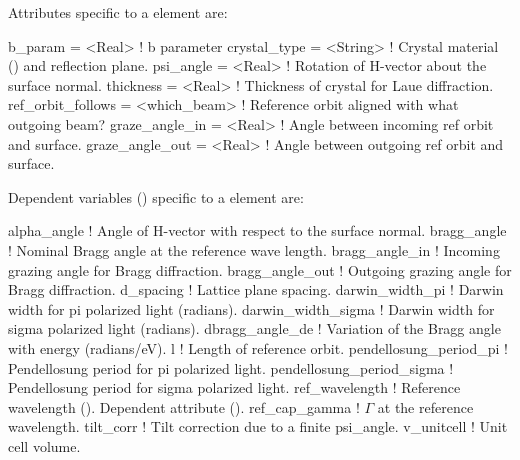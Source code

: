 Attributes specific to a  element are:
\begin{example}
  b_param            = <Real>       ! b parameter
  crystal_type       = <String>     ! Crystal material () and reflection plane.
  psi_angle          = <Real>       ! Rotation of H-vector about the surface normal.
  thickness          = <Real>       ! Thickness of crystal for Laue diffraction.
  ref_orbit_follows  = <which_beam> ! Reference orbit aligned with what outgoing beam?
  graze_angle_in     = <Real>       ! Angle between incoming ref orbit and surface.
  graze_angle_out    = <Real>       ! Angle between outgoing ref orbit and surface.
\end{example}


Dependent variables () specific to a  element are:
\begin{example}
  alpha_angle                ! Angle of H-vector with respect to the surface normal.
  bragg_angle                ! Nominal Bragg angle at the reference wave length. 
  bragg_angle_in             ! Incoming grazing angle for Bragg diffraction.
  bragg_angle_out            ! Outgoing grazing angle for Bragg diffraction.
  d_spacing                  ! Lattice plane spacing. 
  darwin_width_pi            ! Darwin width for pi polarized light (radians).
  darwin_width_sigma         ! Darwin width for sigma polarized light (radians).
  dbragg_angle_de            ! Variation of the Bragg angle with energy (radians/eV).
  l                          ! Length of reference orbit.
  pendellosung_period_pi     ! Pendellosung period for pi polarized light.
  pendellosung_period_sigma  ! Pendellosung period for sigma polarized light.
  ref_wavelength             ! Reference wavelength (). Dependent attribute ().
  ref_cap_gamma              ! \(\Gamma\) at the reference wavelength.
  tilt_corr                  ! Tilt correction due to a finite psi_angle.
  v_unitcell                 ! Unit cell volume. 
\end{example}

